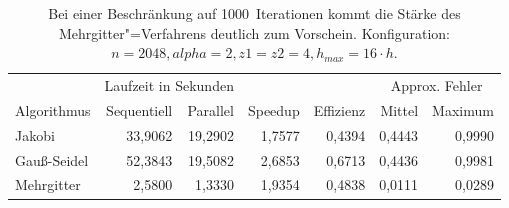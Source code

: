 \documentclass{beamer}
\begin{document}
\begin{table}
    \centering
    \begin{tabular}{|l|r|r|r|r|r|r|} \hline
    & \multicolumn{2}{c|}{Laufzeit in Sekunden} & & & \multicolumn{2}{c|}{Approx. Fehler} \\
    Algorithmus & Sequentiell & Parallel & Speedup & Effizienz & Mittel   & Maximum \\ \hline \hline
    Jakobi      & 33,9062     & 19,2902  & 1,7577  & 0,4394    & 0,4443   & 0,9990  \\
    Gauß-Seidel & 52,3843     & 19,5082  & 2,6853  & 0,6713    & 0,4436   & 0,9981  \\
    Mehrgitter  & 2,5800      & 1,3330   & 1,9354  & 0,4838    & 0,0111   & 0,0289  \\ \hline
    \end{tabular}
    \caption{Bei einer Beschränkung auf 1000~Iterationen kommt die Stärke des Mehrgitter"=Verfahrens deutlich zum Vorschein. Konfiguration: \(n=2048, alpha=2, z1=z2=4, h_{max}=16 \cdot h\).}
    \label{tab:f}
\end{table}
\end{document}
